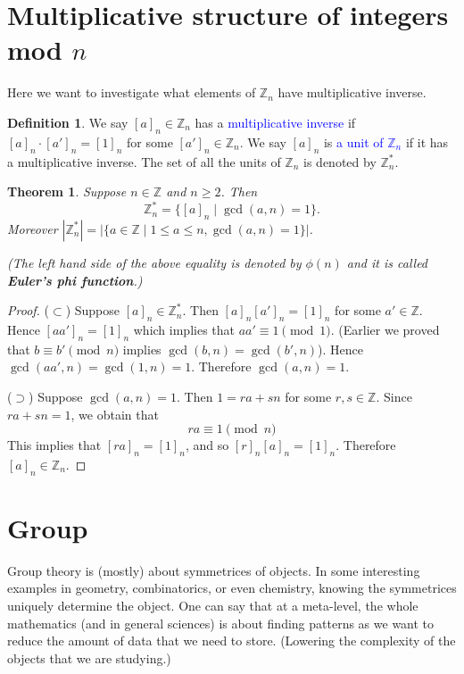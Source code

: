 \documentclass{article}
\theoremstyle{plain}
\newtheorem{theorem}{Theorem}
\theoremstyle{definition}
\newtheorem*{definition}{Definition}
\begin{document}




\section{Multiplicative structure of integers mod $n$}
Here we want to investigate what elements of $\mathbb{Z}_n$
have multiplicative inverse.
\begin{definition}
    We say $[a]_n\in\mathbb{Z}_n$ has a \textcolor{blue}{multiplicative inverse}
    if $[a]_n\cdot [a']_n=[1]_n$ for some $[a']_n\in\mathbb{Z}_n$. We say $[a]_n$
    is \textcolor{blue}{a unit of $\mathbb{Z}_n$} if it has a multiplicative 
    inverse. The set of all the units of $\mathbb{Z}_n$ is denoted
    by $\mathbb{Z}_n^*$.
\end{definition}

\begin{theorem}
    Suppose $n\in\mathbb{Z}$ and $n\geq 2$. Then
    \[\mathbb{Z}_n^*=\{[a]_n\mid \gcd(a,n)=1\}.\]
    Moreover $|\mathbb{Z}_n^*|=|\{a\in\mathbb{Z}\mid 1\leq a\leq n,\gcd(a,n)=1\}|$.

    (The left hand side of the above equality is denoted
    by $\phi(n)$ and it is called \textbf{Euler's phi function}.)
\end{theorem}

\begin{proof}
    ($\subset$) Suppose $[a]_n\in\mathbb{Z}_n^*$. Then $[a]_n[a']_n=[1]_n$
    for some $a'\in\mathbb{Z}$. Hence $[aa']_n=[1]_n$ which implies
    that $aa'\equiv 1\pmod 1$. (Earlier we proved that $b\equiv b'\pmod n$
    implies $\gcd(b,n)=\gcd(b',n)$). Hence $\gcd(aa',n)=\gcd(1,n)=1$.
    Therefore $\gcd(a,n)=1$.

    ($\supset$) Suppose $\gcd(a,n)=1$. Then $1=ra+sn$
    for some $r,s\in\mathbb{Z}$. Since $ra+sn=1$, we obtain that
    \[ra\equiv 1\pmod n\]
    This implies that $[ra]_n=[1]_n$, and so 
    $[r]_n[a]_n=[1]_n$. Therefore $[a]_n\in\mathbb{Z}_n$.
\end{proof}

\section{Group}
Group theory is (mostly) about symmetrices of objects.
In some interesting examples in geometry, combinatorics,
or even chemistry, knowing the symmetrices uniquely 
determine the object. One can say that at a meta-level,
the whole mathematics (and in general sciences) is about
finding patterns as we want to reduce the amount of
data that we need to store. (Lowering the complexity
of the objects that we are studying.)
\end{document}
